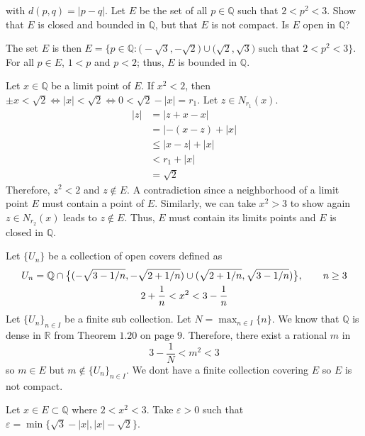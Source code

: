 \begin{exercise}
  with \(d(p, q) = \lvert p - q\rvert\).
  Let \(E\) be the set of all \(p\in\mathbb{Q}\) such that \(2 < p^2 < 3\).
  Show that \(E\) is closed and bounded in \(\mathbb{Q}\), but that \(E\) is
  not compact.
  Is \(E\) open in \(\mathbb{Q}\)?
  \par\smallskip
  The set \(E\) is then
  \(E = \bigl\{p\in\mathbb{Q}\colon\bigl(-\sqrt{3},-\sqrt{2}\bigr)\cup
  \bigl(\sqrt{2},\sqrt{3}\bigr)\text{ such that } 2 < p^2 < 3\bigr\}\).
  For all \(p\in E\), \(1 < p\) and \(p < 2\); thus, \(E\) is bounded in \(\mathbb{Q}\).
  \par\smallskip
  Let \(x\in\mathbb{Q}\) be a limit point of \(E\).
  If \(x^2 < 2\), then \(\pm x < \sqrt{2}\iff\lvert x\rvert < \sqrt{2}\iff 0 < \sqrt{2} - \lvert x\rvert = r_1\).
  Let \(z\in N_{r_1}(x)\).
  \[
  	\begin{aligned}
		\lvert z\rvert &= \lvert z + x - x\rvert\\
		&= \lvert -(x - z) + \lvert x\rvert\\
		&\leq\lvert x - z\rvert + \lvert x\rvert\\
		&< r_1 + \lvert x\rvert\\
		&= \sqrt{2}
	\end{aligned}
  \]
  Therefore, \(z^2 < 2\) and \(z\not\in E\).
  A contradiction since a neighborhood of a limit point \(E\) must contain a point of \(E\).
  Similarly, we can take \(x^2 > 3\) to show again \(z\in N_{r_2}(x)\) leads to \(z\not\in E\).
  Thus, \(E\) must contain its limits points and \(E\) is closed in \(\mathbb{Q}\).
  \par\smallskip
  Let \(\{U_n\}\) be a collection of open covers defined as
  \begin{gather}
  	U_n = \mathbb{Q}\cap\big\{(-\sqrt{3 - 1/n}, -\sqrt{2 + 1/n}) \cup (\sqrt{2 + 1/n}, \sqrt{3 - 1/n})\big\},
	\qquad n\ge 3\notag\\
	2 + \frac{1}{n} < x^2 < 3 - \frac{1}{n}\notag
  \end{gather}
  Let \(\{U_n\}_{n\in I}\) be a finite sub collection.
  Let \(N = \max_{n\in I}\{n\}\).
  We know that \(\mathbb{Q}\) is dense in \(\mathbb{R}\) from Theorem \(1.20\) on page \(9\).
  Therefore, there exist a rational \(m\) in 
  \[
  	3 - \frac{1}{N} < m^2 < 3
  \]
  so \(m\in E\) but \(m\not\in \{U_n\}_{n\in I}\).
  We dont have a finite collection covering \(E\) so \(E\) is not compact.
  \par\smallskip
  Let \(x\in E\subset\mathbb{Q}\) where \(2 < x^2 < 3\).
  Take \(\varepsilon > 0\) such that \(\varepsilon = \min\{\sqrt{3} - \lvert x\rvert, \lvert x\rvert - \sqrt{2}\}\).

\end{exercise}
